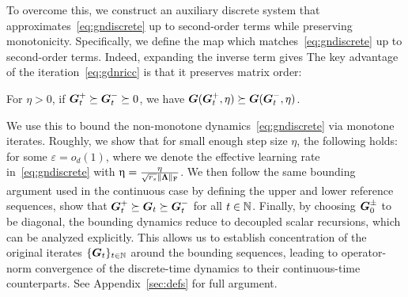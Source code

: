 To overcome this, we construct an auxiliary discrete system that approximates~\eqref{eq:gndiscrete} up to second-order terms while preserving monotonicity. Specifically, we define the map
which matches~\eqref{eq:gndiscrete} up to second-order terms. Indeed, expanding the inverse term gives 
The key advantage of the iteration~\eqref{eq:gdnricc} is that it preserves matrix order:
\begin{proposition}
\label{prop:monotoneupdatetext}
    For $  \eta > 0$, if $\boldsymbol{G}^{+}_t \succeq \boldsymbol{G}^{-}_t \succeq 0$, we have   $\boldsymbol{G}(\boldsymbol{G}^+_t, \eta) \succeq \boldsymbol{G}(\boldsymbol{G}^-_t, \eta)$.
\end{proposition}
We use this to bound the non-monotone dynamics~\eqref{eq:gndiscrete} via monotone iterates. Roughly,  we show that for small enough step size 
$\eta$,  the following holds: 
for some $\varepsilon = o_d(1)$,  where we denote the effective learning rate in~\eqref{eq:gndiscrete} with $\upeta = \tfrac{\eta}{\sqrt{r_s} \lVert\boldsymbol{\Lambda}\rVert_\mathrm{F}}$.  We then follow the same bounding argument used in the continuous case by defining the upper and lower reference sequences, 
show that $\boldsymbol{G}_t^+ \succeq \boldsymbol{G}_t \succeq \boldsymbol{G}_t^-$ for all $t \in \mathbb{N}$.
Finally, by choosing $\boldsymbol{G}^{\pm}_0$ to be diagonal, the bounding dynamics reduce to decoupled scalar recursions, which can be analyzed explicitly. This allows us to establish concentration of the original iterates $\{ \boldsymbol{G}_{t} \}_{t \in \mathbb{N}}$ around the bounding sequences, leading to operator-norm convergence of the discrete-time dynamics to their continuous-time counterparts. See Appendix~\ref{sec:defs} for full argument.

